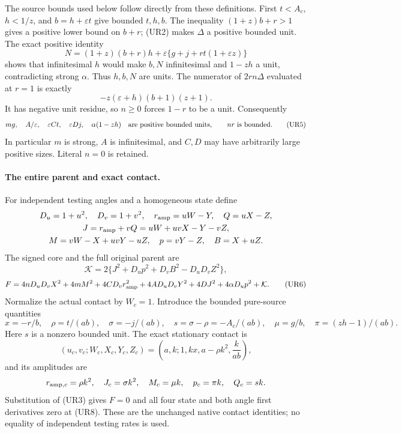 The source bounds used below follow directly from these definitions.
First $t<A_c$, $h<1/z$, and $b=h+\varepsilon t$ give bounded $t,h,b$.
The inequality $(1+z)b+r>1$ gives a positive lower bound on $b+r$;
(UR2) makes $\Delta$ a positive bounded unit. The exact positive identity
\[
 N=(1+z)(b+r)h+
       \varepsilon\{g+j+rt(1+\varepsilon z)\}                 \tag{UR4}
\]
shows that infinitesimal $h$ would make $b,N$ infinitesimal and
$1-zh$ a unit, contradicting strong $\alpha$. Thus $h,b,N$ are units.
The numerator of $2rn\Delta$ evaluated at $r=1$ is exactly
\[
 -z(\varepsilon+h)(b+1)(z+1).
\]
It has negative unit residue, so $n\ge0$ forces $1-r$ to be a unit.
Consequently
\[
 mg,\quad A/\varepsilon,\quad \varepsilon Ct,\quad
 \varepsilon Dj,\quad \alpha(1-zh)
 \quad\hbox{are positive bounded units},\qquad nr\text{ is bounded}.
 \tag{UR5}\label{pc3daa35e9a9b:eq:ui-source-bounds}
\]
In particular $m$ is strong, $A$ is infinitesimal, and $C,D$ may have
arbitrarily large positive sizes. Literal $n=0$ is retained.

\paragraph{The entire parent and exact contact.}
For independent testing angles and a homogeneous state define
\[
 \begin{gathered}
 D_u=1+u^2,\quad D_v=1+v^2,\quad
 r_{\rm amp}=uW-Y,\quad Q=uX-Z,\\
 J=r_{\rm amp}+vQ=uW+uvX-Y-vZ,\\
 M=vW-X+uvY-uZ,\quad p=vY-Z,\quad B=X+uZ.
 \end{gathered}
\]
The signed core and the full original parent are
\[
 \mathcal K=2\{J^2+D_up^2+D_vB^2-D_uD_vZ^2\},
\]
\[
 F=4nD_uD_vX^2+4mM^2+4CD_vr_{\rm amp}^2
       +4AD_uD_vY^2+4DJ^2+4\alpha D_up^2+\mathcal K.
 \tag{UR6}\label{pc3daa35e9a9b:eq:ui-full-parent}
\]
Normalize the actual contact by $W_c=1$. Introduce the bounded pure-source
quantities
\[
 x=-r/b,\quad \rho=t/(ab),\quad \sigma=-j/(ab),\quad
 s=\sigma-\rho=-A_c/(ab),\quad
 \mu=g/b,\quad \pi=(zh-1)/(ab).                       \tag{UR7}
 \label{pc3daa35e9a9b:eq:ui-contact-amplitudes}
\]
Here $s$ is a nonzero bounded unit. The exact stationary contact is
\[
 (u_c,v_c;W_c,X_c,Y_c,Z_c)
 =\left(a,k;1,kx,a-\rho k^2,\frac{k}{ab}\right),       \tag{UR8}
\]
and its amplitudes are
\[
 r_{{\rm amp},c}=\rho k^2,\quad J_c=\sigma k^2,\quad
 M_c=\mu k,\quad p_c=\pi k,\quad Q_c=sk.
\]
Substitution of (UR3) gives $F=0$ and all four state and both angle
first derivatives zero at (UR8). These are the unchanged native
contact identities; no equality of independent testing rates is used.

